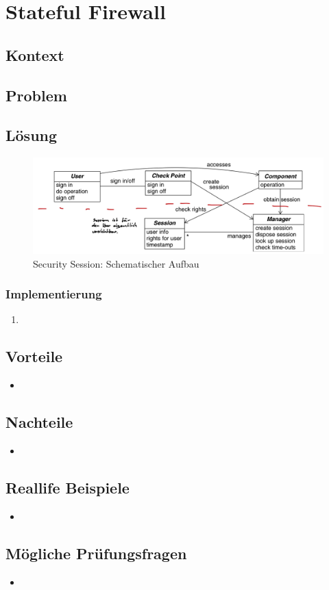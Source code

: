 \section{Stateful Firewall}


\subsection*{Kontext}


\subsection*{Problem}



\subsection*{Lösung}

\begin{figure}[H]
	\includegraphics[width=\textwidth]{content/system-access-control-architecture/images/security-session-structure.png}
	\caption{Security Session: Schematischer Aufbau \cite{SecPatterns06}}
\end{figure}


\subsubsection*{Implementierung}
\begin{enumerate}
	\item 
\end{enumerate}

\subsection*{Vorteile}
\begin{itemize}
	\item 
\end{itemize}

\subsection*{Nachteile}
\begin{itemize}
	\item 
\end{itemize}

\subsection*{Reallife Beispiele}
\begin{itemize}
	\item 
\end{itemize}


\subsection*{Mögliche Prüfungsfragen}
\begin{itemize}
	\item 
\end{itemize}